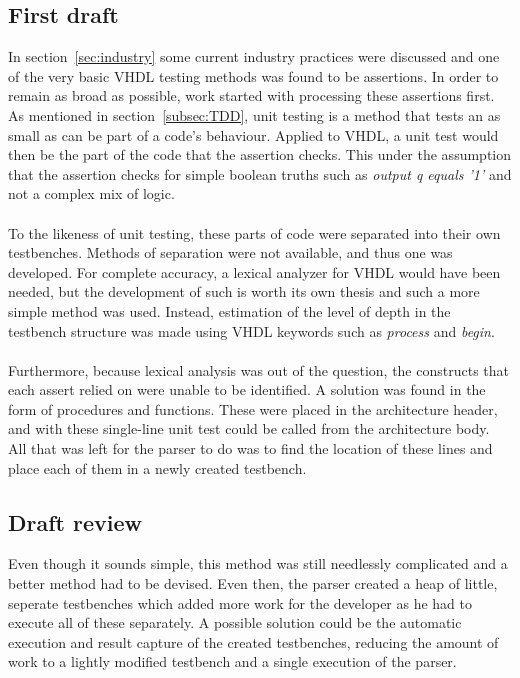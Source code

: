 \documentclass[11pt,british]{article}
\begin{document}
\subsection{First draft}
\label{subsec:first}
In section~\ref{sec:industry} some current industry practices were discussed and one of the very basic VHDL testing methods was found to be assertions. In order to remain as broad as possible, work started with processing these assertions first. As mentioned in section~\ref{subsec:TDD}, unit testing is a method that tests an as small as can be part of a code's behaviour. Applied to \gls{VHDL}, a unit test would then be the part of the code that the assertion checks. This under the assumption that the assertion checks for simple boolean truths such as \emph{output q equals '1'} and not a complex mix of logic.
\\
\\
To the likeness of unit testing, these parts of code were separated into their own testbenches. Methods of separation were not available, and thus one was developed. For complete accuracy, a lexical analyzer for VHDL would have been needed, but the development of such is worth its own thesis and such a more simple method was used. Instead, estimation of the level of depth in the testbench structure was made using VHDL keywords such as \emph{process} and \emph{begin}.
\\
\\
Furthermore, because lexical analysis was out of the question, the constructs that each assert relied on were unable to be identified. A solution was found in the form of procedures and functions. These were placed in the architecture header, and with these single-line unit test could be called from the architecture body. All that was left for the parser to do was to find the location of these lines and place each of them in a newly created testbench.

\subsection{Draft review}
\label{subsec:review}
Even though it sounds simple, this method was still needlessly complicated and a better method had to be devised. Even then, the parser created a heap of little, seperate testbenches which added more work for the developer as he had to execute all of these separately. A possible solution could be the automatic execution and result capture of the created testbenches, reducing the amount of work to a lightly modified testbench and a single execution of the parser.
\end{document}
